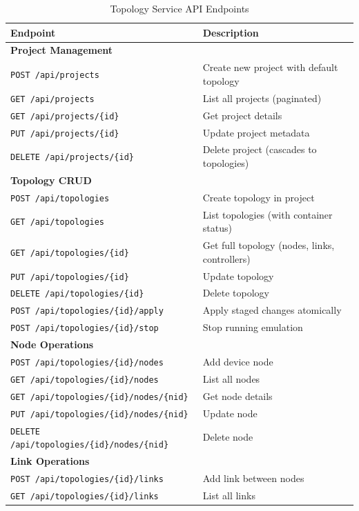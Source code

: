 \documentclass[10pt,a4paper]{article}
\begin{document}
\begin{table}[htbp]
\centering
\small
\caption{Topology Service API Endpoints}
\begin{tabularx}{\textwidth}{lX}
\toprule
\textbf{Endpoint} & \textbf{Description} \\
\midrule
\textbf{Project Management} & \\
\texttt{POST /api/projects} & Create new project with default topology \\
\texttt{GET /api/projects} & List all projects (paginated) \\
\texttt{GET /api/projects/\{id\}} & Get project details \\
\texttt{PUT /api/projects/\{id\}} & Update project metadata \\
\texttt{DELETE /api/projects/\{id\}} & Delete project (cascades to topologies) \\
\midrule
\textbf{Topology CRUD} & \\
\texttt{POST /api/topologies} & Create topology in project \\
\texttt{GET /api/topologies} & List topologies (with container status) \\
\texttt{GET /api/topologies/\{id\}} & Get full topology (nodes, links, controllers) \\
\texttt{PUT /api/topologies/\{id\}} & Update topology \\
\texttt{DELETE /api/topologies/\{id\}} & Delete topology \\
\texttt{POST /api/topologies/\{id\}/apply} & Apply staged changes atomically \\
\texttt{POST /api/topologies/\{id\}/stop} & Stop running emulation \\
\midrule
\textbf{Node Operations} & \\
\texttt{POST /api/topologies/\{id\}/nodes} & Add device node \\
\texttt{GET /api/topologies/\{id\}/nodes} & List all nodes \\
\texttt{GET /api/topologies/\{id\}/nodes/\{nid\}} & Get node details \\
\texttt{PUT /api/topologies/\{id\}/nodes/\{nid\}} & Update node \\
\texttt{DELETE /api/topologies/\{id\}/nodes/\{nid\}} & Delete node \\
\midrule
\textbf{Link Operations} & \\
\texttt{POST /api/topologies/\{id\}/links} & Add link between nodes \\
\texttt{GET /api/topologies/\{id\}/links} & List all links \\

\end{tabularx}
\end{table}
\end{document}

